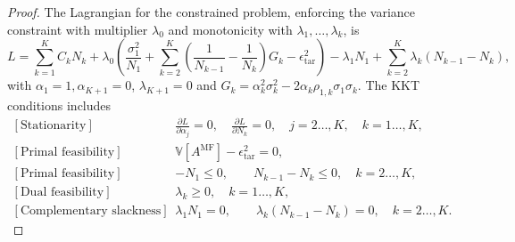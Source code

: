 \begin{proof}
The Lagrangian for the constrained problem, enforcing the variance constraint with multiplier $\lambda_0$ and monotonicity with $\lambda_1,\ldots, \lambda_k$, is
%
\begin{equation*}
L =\sum_{k=1}^K C_kN_k +\lambda_0 \left(\frac{\sigma_1^2}{N_1} + \sum_{k=2}^K \left(\frac{1}{N_{k-1}} - \frac{1}{N_k}\right)G_k- \epsilon_{\text{tar}}^2\right)-\lambda_1 N_1+\sum_{k=2}^K\lambda_k(N_{k-1} - N_k),
\end{equation*}
%
with $\alpha_1 = 1, \alpha_{K+1} = 0$, $\lambda_{K+1} = 0$ and $G_k = \alpha_k^2\sigma_k^2 - 2\alpha_k\rho_{1,k}\sigma_1\sigma_k$.  The KKT conditions includes
%
\[
\begin{array}{ll}
\left[\text{Stationarity}\right]&\frac{\partial L}{\partial \alpha_j}=0,\quad \frac{\partial L}{\partial N_k}=0,\quad j=2\ldots,K, \quad k=1\ldots,K,\\
\left[\text{Primal feasibility}\right]&\mathbb{V}\left[A^{\text{MF}}\right]- \epsilon_{\text{tar}}^2 = 0, \\ 
\left[\text{Primal feasibility}\right] &-N_1\le 0,\qquad N_{k-1}-N_k \le 0, \quad k=2\ldots,K,\\ 
\left[\text{Dual feasibility}\right]  &\lambda_k \ge 0,\quad k=1\ldots,K, \\ 
\left[\text{Complementary slackness}\right]  &\lambda_1 N_1=0,\qquad\lambda_k(N_{k-1}-N_k)=0,\quad k=2\ldots,K.
\end{array}
\]
%



\end{proof}
